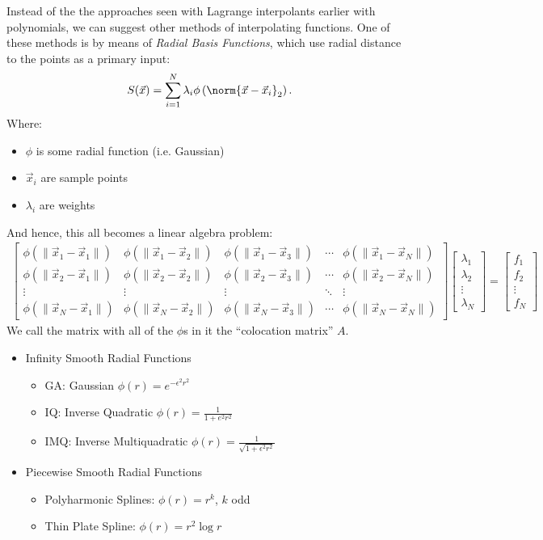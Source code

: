 \documentclass{article}
\begin{document}
Instead of the the approaches seen with Lagrange interpolants earlier with polynomials,
we can suggest other methods of interpolating functions. One of these methods is by means
of \textit{Radial Basis Functions}, which use radial distance to the points as a primary
input:
\begin{align*}
  S(\vec{x}) = \sum_{i=1}^{N}\lambda_i \phi\left(\norm{\vec{x} - \vec{x}_i}_2\right).
\end{align*}
Where:
\begin{itemize}
\item $\phi$ is some radial function (i.e. Gaussian)
\item $\vec{x}_i$ are sample points
\item $\lambda_i$ are weights
\end{itemize}
And hence, this all becomes a linear algebra problem:
\begin{align*}
  \begin{bmatrix}
\phi(\|\vec{x}_1 - \vec{x}_1\|) & \phi(\|\vec{x}_1 - \vec{x}_2\|) & \phi(\|\vec{x}_1 - \vec{x}_3\|) & \cdots & \phi(\|\vec{x}_1 - \vec{x}_N\|) \\
\phi(\|\vec{x}_2 - \vec{x}_1\|) & \phi(\|\vec{x}_2 - \vec{x}_2\|) & \phi(\|\vec{x}_2 - \vec{x}_3\|) & \cdots & \phi(\|\vec{x}_2 - \vec{x}_N\|) \\
\vdots & \vdots & \vdots & \ddots & \vdots \\
\phi(\|\vec{x}_N - \vec{x}_1\|) & \phi(\|\vec{x}_N - \vec{x}_2\|) & \phi(\|\vec{x}_N - \vec{x}_3\|) & \cdots & \phi(\|\vec{x}_N - \vec{x}_N\|)
\end{bmatrix}
\begin{bmatrix}
\lambda_1 \\
\lambda_2 \\
\vdots \\
\lambda_N
\end{bmatrix}
=
\begin{bmatrix}
f_1 \\
f_2 \\
\vdots \\
f_N
\end{bmatrix}
\end{align*}
We call the matrix with all of the $\phi$s in it the ``colocation matrix'' $A$.
\clearpage
{}
\begin{itemize}
  \item Infinity Smooth Radial Functions
  \begin{itemize}
\item GA: Gaussian $\phi(r) = e^{-\epsilon^2 r^2}$
\item IQ: Inverse Quadratic $\phi(r) = \frac{1}{1+e^2r^2}$
\item IMQ: Inverse Multiquadratic $\phi(r) = \frac{1}{\sqrt{1 + \epsilon^2 r^2}}$
  \end{itemize}
\item Piecewise Smooth Radial Functions
  \begin{itemize}
  \item Polyharmonic Splines: $\phi(r) = r^k$, $k$ odd
  \item Thin Plate Spline: $\phi(r) = r^2 \log r$
  \end{itemize}
\end{itemize}
\end{document}
